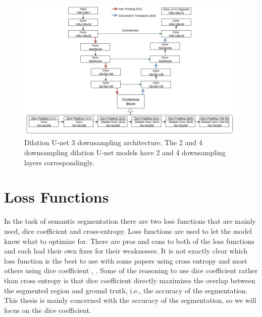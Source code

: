  \begin{figure}[tbh]
\centering
\includegraphics[width=\textwidth]{model_dilunet.png}
\caption{ Dilation U-net 3 downsampling architecture. The 2 and 4 downsampling dilation U-net models have 2 and 4 downsampling layers correspondingly.}
\label{fig_modDilUnet}
\end{figure}

    
\section{Loss Functions}
    In the task of semantic segmentation there are two loss functions that are mainly used, dice coefficient and cross-entropy. 
    Loss functions are used to let the model know what to optimize for.
    There are pros and cons to both of the loss functions and each had their own fixes for their weaknesses. 
    It is not exactly clear which loss function is the best to use with some papers using cross entropy \cite{DBLP:journals/corr/ChenPK0Y16} and most others using dice coefficient \cite{10.1007/978-3-030-01449-0_16dilatedunet}, \cite{DBLP:journals/corr/abs-1805-10720}. Some of the reasoning to use dice coefficient rather than cross entropy is that dice coefficient directly maximizes the overlap between the segmented region and ground truth, i.e., the accuracy of the segmentation. 
    This thesis is mainly concerned with the accuracy of the segmentation, so we will focus on the dice coefficient.
    
    
